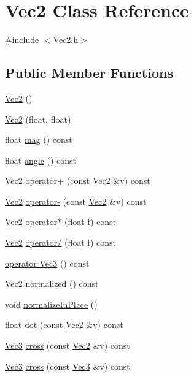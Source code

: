 \hypertarget{class_vec2}{}\section{Vec2 Class Reference}
\label{class_vec2}


{\ttfamily \#include $<$Vec2.\+h$>$}

\subsection*{Public Member Functions}
\begin{DoxyCompactItemize}
\item 
\hyperlink{class_vec2_a76080feed7005893ecc634f903cfbae0}{Vec2} ()
\item 
\hyperlink{class_vec2_a10b147b77822356897d8cff9533f5a89}{Vec2} (float, float)
\item 
float \hyperlink{class_vec2_aec992aac17d87978d72af738813c1282}{mag} () const 
\item 
float \hyperlink{class_vec2_a9d4979cfac07592169d7afbdef2fd08f}{angle} () const 
\item 
\hyperlink{class_vec2}{Vec2} \hyperlink{class_vec2_a55982187727e6fef357273be8e269526}{operator+} (const \hyperlink{class_vec2}{Vec2} \&v) const 
\item 
\hyperlink{class_vec2}{Vec2} \hyperlink{class_vec2_adfaf0492c67e51fc89e3f7f484519de7}{operator-\/} (const \hyperlink{class_vec2}{Vec2} \&v) const 
\item 
\hyperlink{class_vec2}{Vec2} \hyperlink{class_vec2_a7965908088c7036cd57831d8049dd93e}{operator$\ast$} (float f) const 
\item 
\hyperlink{class_vec2}{Vec2} \hyperlink{class_vec2_ae1b8fe5230596bf9ba86284e900bdd83}{operator/} (float f) const 
\item 
\hyperlink{class_vec2_aab2108d355eeac6b580790c871cb2035}{operator Vec3} () const 
\item 
\hyperlink{class_vec2}{Vec2} \hyperlink{class_vec2_a2e1afd5523eb873c98e664bae843e2e6}{normalized} () const 
\item 
void \hyperlink{class_vec2_a41d4890cfc41c185713c95b3a43824c8}{normalize\+In\+Place} ()
\item 
float \hyperlink{class_vec2_aafb32f618ad13d0d98e6921f2aef53a3}{dot} (const \hyperlink{class_vec2}{Vec2} \&v) const 
\item 
\hyperlink{class_vec3}{Vec3} \hyperlink{class_vec2_a00e8b8c6275faf54c69d569557448bcd}{cross} (const \hyperlink{class_vec2}{Vec2} \&v) const 
\item 
\hyperlink{class_vec3}{Vec3} \hyperlink{class_vec2_a122a6721d864a856b3ed4cb111197d5e}{cross} (const \hyperlink{class_vec3}{Vec3} \&v) const 
\end{DoxyCompactItemize}
